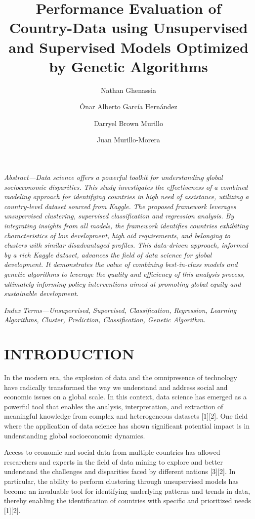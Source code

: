 \documentclass{article}
\title{\textbf{Performance Evaluation of Country-Data using Unsupervised and Supervised Models Optimized by Genetic Algorithms}}
\author[1]{Nathan Ghenassia}
\author[2]{Ónar Alberto García Hernández}
\author[3]{Darryel Brown Murillo}
\author[4]{Juan Murillo-Morera}
\affil[1,2,3,4]{Lead University Costa Rica}
\affil[ ]{Email: \texttt{\{nathan.ghenassia, onar.garcia, darryel.brown, juan.murillo.morera\}@ulead.ac.cr}}
\date{} %
\begin{document}
\maketitle

\begin{multicols}{2}

\textit{Abstract—Data science offers a powerful toolkit for understanding global socioeconomic disparities. This study investigates the effectiveness of a combined modeling approach for identifying countries in high need of assistance, utilizing a country-level dataset sourced from Kaggle. The proposed framework leverages unsupervised clustering, supervised classification and regression analysis. By integrating insights from all models, the framework identifies countries exhibiting characteristics of low development, high aid requirements, and belonging to clusters with similar disadvantaged profiles. This data-driven approach, informed by a rich Kaggle dataset, advances the field of data science for global development. It demonstrates the value of combining best-in-class models and genetic algorithms to leverage the quality and efficiency of this analysis process, ultimately informing policy interventions aimed at promoting global equity and sustainable development.}

\textit{Index Terms—Unsupervised, Supervised, Classification, Regression, Learning Algorithms, Cluster, Prediction, Classification, Genetic Algorithm.}

\section{INTRODUCTION}
\setlength{\parindent}{3em} %
In the modern era, the explosion of data and the omnipresence of technology have radically transformed the way we understand and address social and economic issues on a global scale. In this context, data science has emerged as a powerful tool that enables the analysis, interpretation, and extraction of meaningful knowledge from complex and heterogeneous datasets [1][2]. One field where the application of data science has shown significant potential impact is in understanding global socioeconomic dynamics.

Access to economic and social data from multiple countries has allowed researchers and experts in the field of data mining to explore and better understand the challenges and disparities faced by different nations [3][2]. In particular, the ability to perform clustering through unsupervised models has become an invaluable tool for identifying underlying patterns and trends in data, thereby enabling the identification of countries with specific and prioritized needs [1][2].


\end{multicols}
\end{document}
